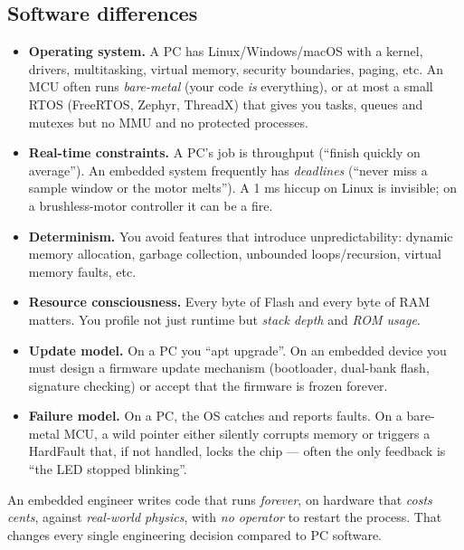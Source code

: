 \documentclass[11pt,a4paper]{article}
\begin{document}
\subsection{Software differences}

\begin{itemize}[leftmargin=*]
    \item \textbf{Operating system.} A PC has Linux/Windows/macOS with a kernel,
    drivers, multitasking, virtual memory, security boundaries, paging, etc.
    An MCU often runs \emph{bare-metal} (your code \emph{is} everything), or at
    most a small RTOS (FreeRTOS, Zephyr, ThreadX) that gives you tasks,
    queues and mutexes but no MMU and no protected processes.
    \item \textbf{Real-time constraints.} A PC's job is throughput
    (``finish quickly on average''). An embedded system frequently has
    \emph{deadlines} (``never miss a sample window or the motor melts'').
    A 1 ms hiccup on Linux is invisible; on a brushless-motor controller it
    can be a fire.
    \item \textbf{Determinism.} You avoid features that introduce
    unpredictability: dynamic memory allocation, garbage collection,
    unbounded loops/recursion, virtual memory faults, etc.
    \item \textbf{Resource consciousness.} Every byte of Flash and every
    byte of RAM matters. You profile not just runtime but \emph{stack depth}
    and \emph{ROM usage}.
    \item \textbf{Update model.} On a PC you ``apt upgrade''. On an embedded
    device you must design a firmware update mechanism (bootloader, dual-bank
    flash, signature checking) or accept that the firmware is frozen forever.
    \item \textbf{Failure model.} On a PC, the OS catches and reports faults.
    On a bare-metal MCU, a wild pointer either silently corrupts memory or
    triggers a HardFault that, if not handled, locks the chip --- often the
    only feedback is ``the LED stopped blinking''.
\end{itemize}

\begin{keyidea}
An embedded engineer writes code that runs \emph{forever}, on hardware that
\emph{costs cents}, against \emph{real-world physics}, with \emph{no operator}
to restart the process. That changes every single engineering decision compared
to PC software.
\end{keyidea}
\end{document}
